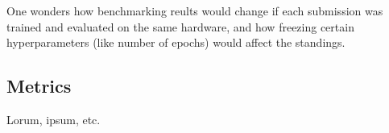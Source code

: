 One wonders how benchmarking reults would change if each submission was trained and evaluated on the same hardware, and how freezing certain hyperparameters (like number of epochs) would affect the standings.

\subsection{Metrics}
\label{metrics}

Lorum, ipsum, etc.
